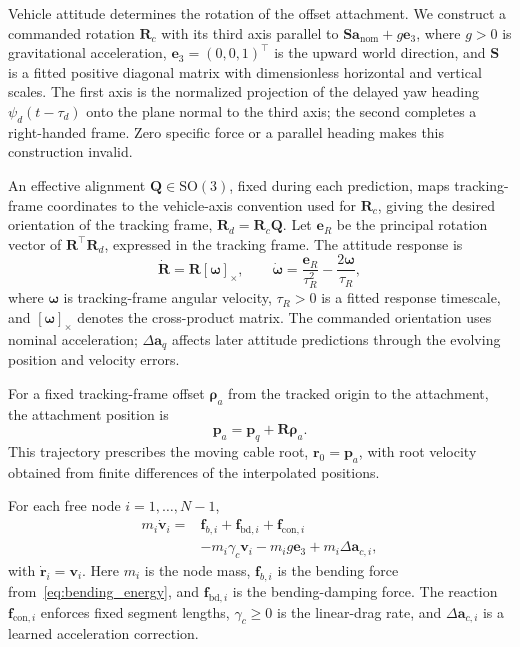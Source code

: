 \documentclass[letterpaper, 10 pt, conference]{ieeeconf}
\begin{document}
Vehicle attitude determines the rotation of the offset attachment.
We construct a commanded rotation $\mathbf R_c$ with its third
axis parallel to
$\mathbf S\mathbf a_{\mathrm{nom}}+g\mathbf e_3$,
where $g>0$ is gravitational acceleration,
$\mathbf e_3=(0,0,1)^\top$ is the upward world direction,
and $\mathbf S$ is a fitted positive diagonal matrix with
dimensionless horizontal and vertical scales.
The first axis is the normalized projection of the delayed yaw
heading $\psi_d(t-\tau_d)$ onto the plane normal to the third
axis; the second completes a right-handed frame. Zero specific
force or a parallel heading makes this construction invalid.

An effective alignment $\mathbf Q\in\mathrm{SO}(3)$, fixed
during each prediction, maps tracking-frame coordinates to the
vehicle-axis convention used for $\mathbf R_c$, giving the
desired orientation of the tracking frame,
$\mathbf R_d=\mathbf R_c\mathbf Q$.
Let $\mathbf e_R$ be the principal rotation vector of
$\mathbf R^\top\mathbf R_d$, expressed in the tracking frame.
The attitude response is
\begin{equation}
\dot{\mathbf R}=\mathbf R[\boldsymbol\omega]_\times,
\qquad
\dot{\boldsymbol\omega}=\frac{\mathbf e_R}{\tau_R^2}
-\frac{2\boldsymbol\omega}{\tau_R},
\label{eq:attitude_response}
\end{equation}
where $\boldsymbol\omega$ is tracking-frame angular velocity,
$\tau_R>0$ is a fitted response timescale, and
$[\boldsymbol\omega]_\times$ denotes the cross-product matrix.
The commanded orientation uses nominal acceleration;
$\Delta\mathbf a_q$ affects later attitude predictions
through the evolving position and velocity errors.

For a fixed tracking-frame offset $\boldsymbol\rho_a$
from the tracked origin to the attachment, the attachment
position is
\begin{equation}
\mathbf p_a=\mathbf p_q+\mathbf R\boldsymbol\rho_a.
\label{eq:attachment_mapping}
\end{equation}
This trajectory prescribes the moving cable root,
$\mathbf r_0=\mathbf p_a$, with root velocity obtained from
finite differences of the interpolated positions.

For each free node $i=1,\ldots,N-1$,
\begin{equation}
\begin{aligned}
m_i\dot{\mathbf v}_i
={}&\mathbf f_{b,i}
   +\mathbf f_{\mathrm{bd},i}
   +\mathbf f_{\mathrm{con},i}\\
&-m_i\gamma_c\mathbf v_i
 -m_i g\mathbf e_3
 +m_i\Delta\mathbf a_{c,i},
\end{aligned}
\label{eq:driven_cable_dynamics}
\end{equation}
with $\dot{\mathbf r}_i=\mathbf v_i$.
Here $m_i$ is the node mass, $\mathbf f_{b,i}$ is the bending
force from~\eqref{eq:bending_energy}, and
$\mathbf f_{\mathrm{bd},i}$ is the bending-damping force.
The reaction $\mathbf f_{\mathrm{con},i}$ enforces fixed
segment lengths, $\gamma_c\geq0$ is the linear-drag rate,
and $\Delta\mathbf a_{c,i}$ is a learned acceleration correction.
\end{document}
